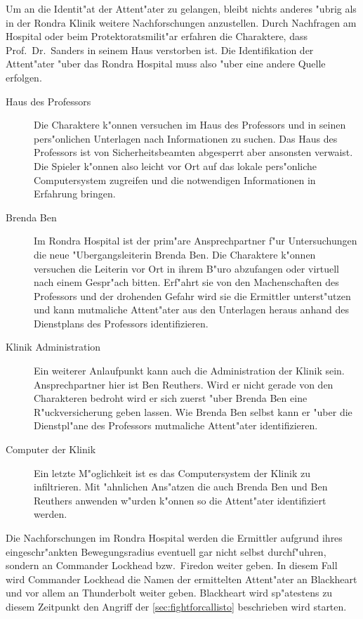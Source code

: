 
 Um an die Identit"at der Attent"ater zu gelangen, bleibt nichts anderes "ubrig als in der Rondra Klinik weitere Nachforschungen anzustellen. Durch Nachfragen am Hospital oder beim Protektoratsmilit"ar erfahren die Charaktere, dass Prof.~Dr.~Sanders in seinem Haus verstorben ist. Die Identifikation der Attent"ater "uber das Rondra Hospital muss also "uber eine andere Quelle erfolgen.

 \begin{description}
	\item [Haus des Professors] Die Charaktere k"onnen versuchen im Haus des Professors und in seinen pers"onlichen Unterlagen nach 
		Informationen zu suchen. Das Haus des Professors ist von Sicherheitsbeamten abgesperrt aber ansonsten verwaist. Die Spieler k"onnen also leicht vor Ort auf das lokale pers"onliche Computersystem zugreifen und die notwendigen Informationen in Erfahrung bringen.
	\item [Brenda Ben] Im Rondra Hospital ist der prim"are Ansprechpartner f"ur Untersuchungen die neue "Ubergangsleiterin Brenda Ben. 
		Die Charaktere k"onnen versuchen die Leiterin vor Ort in ihrem B"uro abzufangen oder virtuell nach einem Gespr"ach bitten. Erf"ahrt sie von den Machenschaften des Professors und der drohenden Gefahr wird sie die Ermittler unterst"utzen und kann mutma\3liche Attent"ater aus den Unterlagen heraus anhand des Dienstplans des Professors identifizieren.
	\item [Klinik Administration] Ein weiterer Anlaufpunkt kann auch die Administration der Klinik sein. Ansprechpartner hier ist Ben 
		Reuthers. Wird er nicht gerade von den Charakteren bedroht wird er sich zuerst "uber Brenda Ben eine R"uckversicherung geben lassen. Wie Brenda Ben selbst kann er "uber die Dienstpl"ane des Professors mutma\3liche Attent"ater identifizieren.
	\item [Computer der Klinik] Ein letzte M"oglichkeit ist es das Computersystem der Klinik zu infiltrieren. Mit "ahnlichen Ans"atzen 
		die auch Brenda Ben und Ben Reuthers anwenden w"urden k"onnen so die Attent"ater identifiziert werden.
 \end{description}

 Die Nachforschungen im Rondra Hospital werden die Ermittler aufgrund ihres eingeschr"ankten Bewegungsradius eventuell gar nicht selbst durchf"uhren, sondern an Commander Lockhead bzw.~Firedon weiter geben. In diesem Fall wird Commander Lockhead die Namen der ermittelten Attent"ater an Blackheart und vor allem an Thunderbolt weiter geben. Blackheart wird sp"atestens zu diesem Zeitpunkt den Angriff der  \cref{sec:fightforcallisto} beschrieben wird starten.
